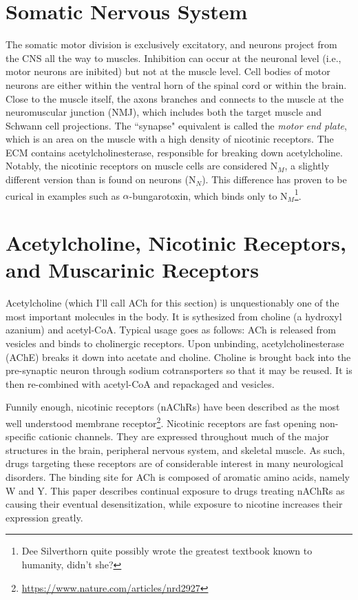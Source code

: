 \documentclass[12pt]{report}
\begin{document}
\section{Somatic Nervous System}
The somatic motor division is exclusively excitatory, and neurons project from the CNS all the way to muscles. Inhibition can occur at the neuronal level (i.e., motor neurons are inibited) but not at the muscle level. Cell bodies of motor neurons are either within the ventral horn of the spinal cord or within the brain. Close to the muscle itself, the axons branches and connects to the muscle at the neuromuscular junction (NMJ), which includes both the target muscle and Schwann cell projections. The ``synapse" equivalent is called the \textit{motor end plate}, which is an area on the muscle with a high density of nicotinic receptors. The ECM contains acetylcholinesterase, responsible for breaking down acetylcholine. Notably, the nicotinic receptors on muscle cells are considered N$_M$, a slightly different version than is found on neurons (N$_N$). This difference has proven to be curical in examples such as $\alpha$-bungarotoxin, which binds only to N$_M$\footnote{Dee Silverthorn quite possibly wrote the greatest textbook known to humanity, didn't she?}.

\section{Acetylcholine, Nicotinic Receptors, and Muscarinic Receptors}

Acetylcholine (which I'll call ACh for this section) is unquestionably one of the most important molecules in the body. It is sythesized from choline (a hydroxyl azanium) and acetyl-CoA. Typical usage goes as follows: ACh is released from vesicles and binds to cholinergic receptors. Upon unbinding, acetylcholinesterase (AChE) breaks it down into acetate and choline. Choline is brought back into the pre-synaptic neuron through sodium cotransporters so that it may be reused. It is then re-combined with acetyl-CoA and repackaged and vesicles.\newline 

Funnily enough, nicotinic receptors (nAChRs) have been described as the most well understood membrane receptor\footnote{\url{https://www.nature.com/articles/nrd2927}}. Nicotinic receptors are fast opening non-specific cationic channels.  They are expressed throughout much of the major structures in the brain, peripheral nervous system, and skeletal muscle. As such, drugs targeting these receptors are of considerable interest in many neurological disorders. The binding site for ACh is composed of aromatic amino acids, namely W and Y. This paper describes continual exposure to drugs treating nAChRs as causing their eventual desensitization, while exposure to nicotine increases their expression greatly.\newline
\end{document}
